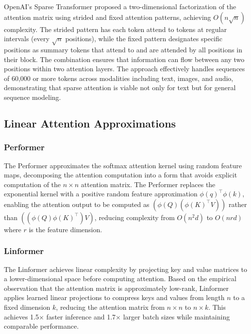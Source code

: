 \documentclass[11pt,letterpaper]{article}
\begin{document}
OpenAI's Sparse Transformer proposed a two-dimensional factorization of the attention matrix using strided and fixed attention patterns, achieving $O(n\sqrt{n})$ complexity. The strided pattern has each token attend to tokens at regular intervals (every $\sqrt{n}$ positions), while the fixed pattern designates specific positions as summary tokens that attend to and are attended by all positions in their block. The combination ensures that information can flow between any two positions within two attention layers. The approach effectively handles sequences of 60,000 or more tokens across modalities including text, images, and audio, demonstrating that sparse attention is viable not only for text but for general sequence modeling.

\subsection{Linear Attention Approximations}

\subsubsection{Performer}

The Performer \cite{choromanski2021rethinking} approximates the softmax attention kernel using random feature maps, decomposing the attention computation into a form that avoids explicit computation of the $n \times n$ attention matrix. The Performer replaces the exponential kernel with a positive random feature approximation $\phi(q)^\top \phi(k)$, enabling the attention output to be computed as $(\phi(Q) (\phi(K)^\top V))$ rather than $((\phi(Q) \phi(K)^\top) V)$, reducing complexity from $O(n^2 d)$ to $O(n r d)$ where $r$ is the feature dimension.

\subsubsection{Linformer}

The Linformer \cite{wang2020linformer} achieves linear complexity by projecting key and value matrices to a lower-dimensional space before computing attention. Based on the empirical observation that the attention matrix is approximately low-rank, Linformer applies learned linear projections to compress keys and values from length $n$ to a fixed dimension $k$, reducing the attention matrix from $n \times n$ to $n \times k$. This achieves 1.5$\times$ faster inference and 1.7$\times$ larger batch sizes while maintaining comparable performance.
\end{document}

